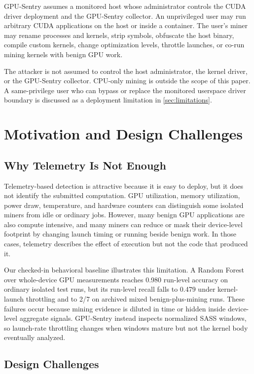 GPU-Sentry assumes a monitored host whose administrator controls the CUDA driver deployment and the GPU-Sentry collector. An unprivileged user may run arbitrary CUDA applications on the host or inside a container. The user's miner may rename processes and kernels, strip symbols, obfuscate the host binary, compile custom kernels, change optimization levels, throttle launches, or co-run mining kernels with benign GPU work.

The attacker is not assumed to control the host administrator, the kernel driver, or the GPU-Sentry collector. CPU-only mining is outside the scope of this paper. A same-privilege user who can bypass or replace the monitored userspace driver boundary is discussed as a deployment limitation in \cref{sec:limitations}.

\section{Motivation and Design Challenges}
\label{sec:motivation}

\subsection{Why Telemetry Is Not Enough}

Telemetry-based detection is attractive because it is easy to deploy, but it does not identify the submitted computation. GPU utilization, memory utilization, power draw, temperature, and hardware counters can distinguish some isolated miners from idle or ordinary jobs. However, many benign GPU applications are also compute intensive, and many miners can reduce or mask their device-level footprint by changing launch timing or running beside benign work. In those cases, telemetry describes the effect of execution but not the code that produced it.

Our checked-in behavioral baseline illustrates this limitation. A Random Forest over whole-device GPU measurements reaches 0.980 run-level accuracy on ordinary isolated test runs, but its run-level recall falls to 0.479 under kernel-launch throttling and to 2/7 on archived mixed benign-plus-mining runs. These failures occur because mining evidence is diluted in time or hidden inside device-level aggregate signals. GPU-Sentry instead inspects normalized SASS windows, so launch-rate throttling changes when windows mature but not the kernel body eventually analyzed.

\subsection{Design Challenges}

